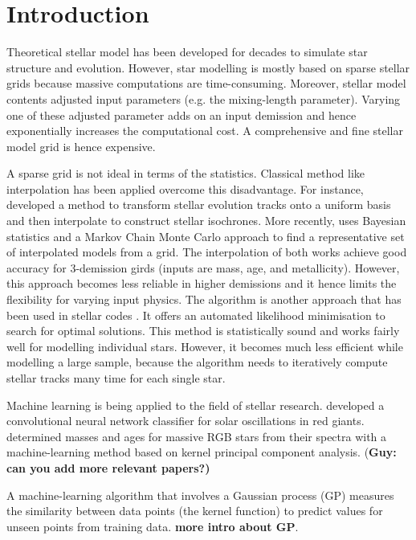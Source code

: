 \section{Introduction}

Theoretical stellar model has been developed for decades to simulate star structure and evolution. However, star modelling is mostly based on sparse stellar grids \citep[e.g.][]{2016ApJ...823..102C} because massive computations are time-consuming. Moreover, stellar model contents adjusted input parameters (e.g. the mixing-length parameter). Varying one of these adjusted parameter adds on an input demission and hence exponentially increases the computational cost. A comprehensive and fine stellar model grid is hence expensive. 

A sparse grid is not ideal in terms of the statistics. Classical method like interpolation has been applied overcome this disadvantage. For instance, \citet{2016ApJS..222....8D} developed a method to transform stellar evolution tracks onto a uniform basis and then interpolate to construct stellar isochrones. More recently, \citet{2019MNRAS.484..771R} uses Bayesian statistics and a Markov Chain Monte Carlo approach to find a representative set of interpolated models from a grid. The interpolation of both works achieve good accuracy for 3-demission girds (inputs are mass, age, and metallicity). However, this approach becomes less reliable in higher demissions and it hence limits the flexibility for varying input physics. The algorithm is another approach that has been used in stellar codes \citep[e.g.][]{2013ApJS..208....4P}. It offers an automated likelihood minimisation to search for optimal solutions. This method is statistically sound and works fairly well for modelling individual stars. However, it becomes much less efficient while modelling a large sample, because the algorithm needs to iteratively compute stellar tracks many time for each single star.     

Machine learning is being applied to the field of stellar research. \citet{2018MNRAS.476.3233H} developed a convolutional neural network classifier for solar oscillations in red giants. \citet{2019MNRAS.484.5315W} determined masses and ages for massive RGB stars from their spectra with a machine-learning method based on kernel principal component analysis.  {(\bf Guy: can you add more relevant papers?)}

A machine-learning algorithm that involves a Gaussian process (GP) measures the similarity between data points (the kernel function) to predict values for unseen points from training data. {\bf more intro about GP}. 

